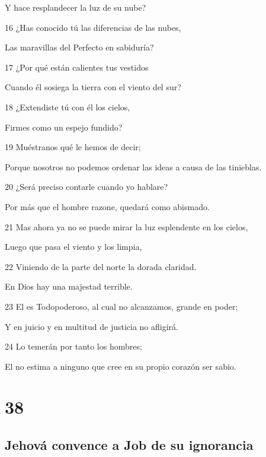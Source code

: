 \par Y hace resplandecer la luz de su nube?
\par 16 ¿Has conocido tú las diferencias de las nubes,
\par Las maravillas del Perfecto en sabiduría?
\par 17 ¿Por qué están calientes tus vestidos
\par Cuando él sosiega la tierra con el viento del sur?
\par 18 ¿Extendiste tú con él los cielos,
\par Firmes como un espejo fundido? 
\par 19 Muéstranos qué le hemos de decir; 
\par Porque nosotros no podemos ordenar las ideas a causa de las tinieblas.
\par 20 ¿Será preciso contarle cuando yo hablare?
\par Por más que el hombre razone, quedará como abismado.
\par 21 Mas ahora ya no se puede mirar la luz esplendente en los cielos,
\par Luego que pasa el viento y los limpia,
\par 22 Viniendo de la parte del norte la dorada claridad.
\par En Dios hay una majestad terrible.
\par 23 El es Todopoderoso, al cual no alcanzamos, grande en poder;
\par Y en juicio y en multitud de justicia no afligirá.
\par 24 Lo temerán por tanto los hombres;
\par El no estima a ninguno que cree en su propio corazón ser sabio.

\chapter{38}

\section*{Jehová convence a Job de su ignorancia}

